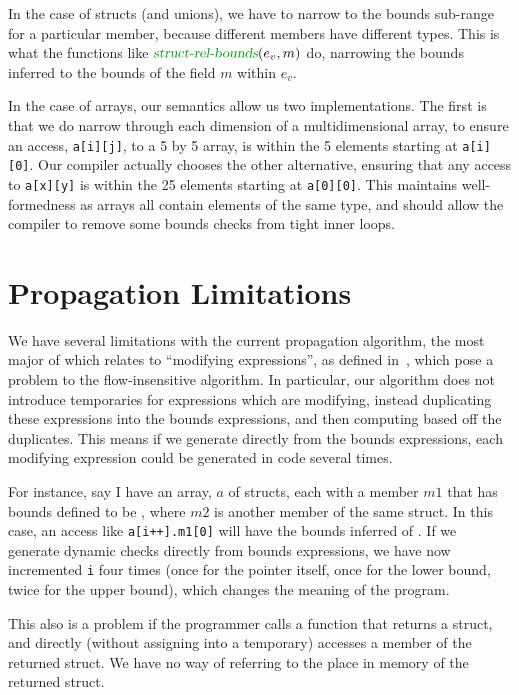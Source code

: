 In the case of structs (and unions), we have to narrow to the bounds
sub-range for a particular member, because different members have
different types. This is what the functions like $\srbounds(e_v, m)$
do, narrowing the bounds inferred to the bounds of the field $m$
within $e_v$.

In the case of arrays, our semantics allow us two implementations. The
first is that we do narrow through each dimension of a
multidimensional array, to ensure an access, \lstinline|a[i][j]|, to a
5 by 5 array, is within the 5 elements starting at
\lstinline|a[i][0]|. Our compiler actually chooses the other
alternative, ensuring that any access to \lstinline|a[x][y]| is within
the 25 elements starting at \lstinline|a[0][0]|. This maintains
well-formedness as arrays all contain elements of the same type, and
should allow the compiler to remove some bounds checks from tight
inner loops.

\section{Propagation Limitations}
\label{sec:prop-limitations}

We have several limitations with the current propagation algorithm,
the most major of which relates to ``modifying expressions'', as
defined in~\cite[Section 3.4]{CheckedCv06}, which pose a problem to
the flow-insensitive algorithm. In particular, our algorithm does not
introduce temporaries for expressions which are modifying, instead
duplicating these expressions into the bounds expressions, and then
computing based off the duplicates. This means if we generate directly
from the bounds expressions, each modifying expression could be
generated in code several times.

For instance, say I have an array, $a$ of structs, each with a member
$m1$ that has bounds defined to be , where $m2$
is another member of the same struct. In this case, an access like
\lstinline|a[i++].m1[0]| will have the bounds inferred of
. If we generate dynamic
checks directly from bounds expressions, we have now incremented
\lstinline|i| four times (once for the pointer itself, once for the
lower bound, twice for the upper bound), which changes the meaning of
the program.

This also is a problem if the programmer calls a function that returns
a struct, and directly (without assigning into a temporary) accesses a
member of the returned struct. We have no way of referring to the
place in memory of the returned struct.

